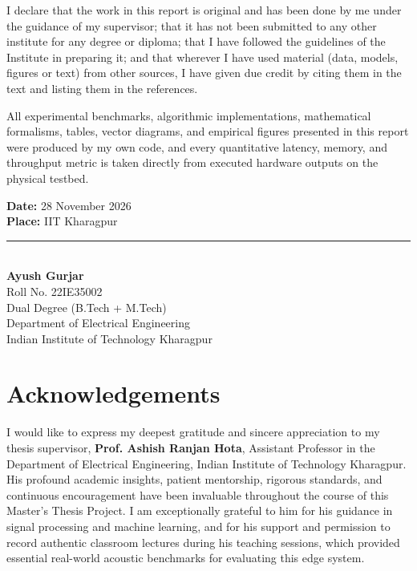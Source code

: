 \documentclass[11pt,a4paper,oneside]{report}
\begin{document}
I declare that the work in this report is original and has been done by me under the guidance of my supervisor; that it has not been submitted to any other institute for any degree or diploma; that I have followed the guidelines of the Institute in preparing it; and that wherever I have used material (data, models, figures or text) from other sources, I have given due credit by citing them in the text and listing them in the references. 

All experimental benchmarks, algorithmic implementations, mathematical formalisms, tables, vector diagrams, and empirical figures presented in this report were produced by my own code, and every quantitative latency, memory, and throughput metric is taken directly from executed hardware outputs on the physical testbed.

\vspace{3.5cm}

\noindent
\begin{minipage}[t]{0.5\textwidth}
\textbf{Date:} 28 November 2026\\[0.2cm]
\textbf{Place:} IIT Kharagpur
\end{minipage}
\hfill
\begin{minipage}[t]{0.45\textwidth}
\rule{6.5cm}{0.4pt}\\[0.2cm]
\textbf{Ayush Gurjar}\\
Roll No. 22IE35002\\
Dual Degree (B.Tech + M.Tech)\\
Department of Electrical Engineering\\
Indian Institute of Technology Kharagpur
\end{minipage}

\clearpage

\chapter*{Acknowledgements}

I would like to express my deepest gratitude and sincere appreciation to my thesis supervisor, \textbf{Prof. Ashish Ranjan Hota}, Assistant Professor in the Department of Electrical Engineering, Indian Institute of Technology Kharagpur. His profound academic insights, patient mentorship, rigorous standards, and continuous encouragement have been invaluable throughout the course of this Master's Thesis Project. I am exceptionally grateful to him for his guidance in signal processing and machine learning, and for his support and permission to record authentic classroom lectures during his teaching sessions, which provided essential real-world acoustic benchmarks for evaluating this edge system.
\end{document}
